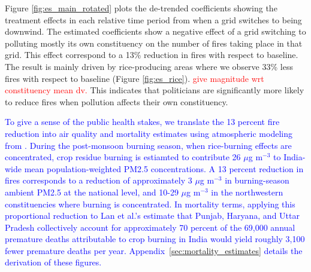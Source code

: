 \documentclass[12pt]{article}
\begin{document}
Figure \ref{fig:es_main_rotated} plots the de-trended coefficients showing the treatment effects in each relative time period from when a grid switches to being downwind.  The estimated coefficients show a negative effect of a grid switching to polluting mostly its own constituency on the number of fires taking place in that grid. This effect correspond to a 13\% reduction in fires with respect to baseline. The result is mainly driven by rice-producing areas where we observe 33\% less fires with respect to baseline (Figure \ref{fig:es_rice}). \textcolor{red}{give magnitude wrt constituency mean dv.} This indicates that politicians are significantly more likely to reduce fires when pollution affects their own constituency. 

    \textcolor{blue}{To give a sense of the public health stakes, we translate the 13 percent fire reduction into air quality and mortality estimates using atmospheric modeling from \citet{lan2022air}. During the post-monsoon burning season, when rice-burning effects are concentrated, crop residue burning is estiamted to contribute 26 $\mu$g m$^{-3}$ to India-wide mean population-weighted PM2.5 concentrations. A 13 percent reduction in fires corresponds to a reduction of approximately 3 $\mu$g m$^{-3}$ in burning-season ambient PM2.5 at the national level, and 10-29 $\mu$g m$^{-3}$ in the northwestern constituencies where burning is concentrated. In mortality terms, applying this proportional reduction to Lan et al.'s estimate that Punjab, Haryana, and Uttar Pradesh collectively account for approximately 70 percent of the 69,000 annual premature deaths attributable to crop burning in India would yield roughly 3,100 fewer premature deaths per year. Appendix~\ref{sec:mortality_estimates} details the derivation of these figures.}

\end{document}

